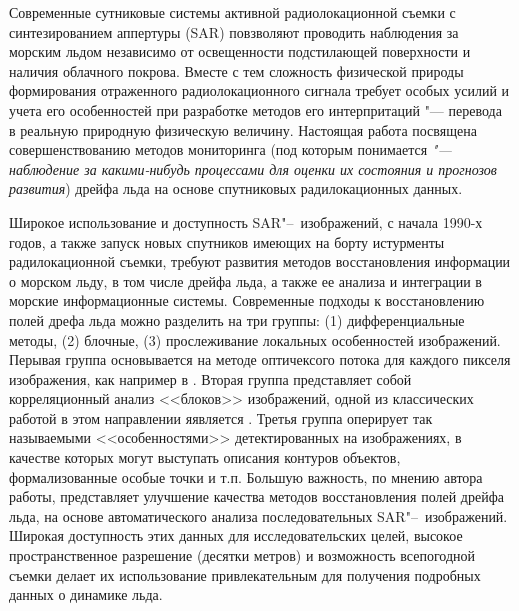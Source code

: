Современные сутниковые системы активной радиолокационной съемки с синтезированием аппертуры (SAR)  \cite{sar} повзволяют проводить наблюдения за морским льдом независимо от освещенности подстилающей поверхности и наличия облачного покрова. Вместе с тем сложность физической природы формирования отраженного радиолокационного сигнала требует особых усилий и учета его особенностей при разработке методов его интерпритаций "--- перевода в реальную природную физическую величину. Настоящая работа посвящена совершенствованию методов мониторинга (под которым понимается \textit{"--- наблюдение за какими-нибудь процессами для оценки их состояния и прогнозов развития}) дрейфа льда на основе спутниковых радилокационных данных.

Широкое использование и доступность SAR"--~изображений, с начала 1990-х годов, а также запуск новых спутников имеющих на борту истурменты радилокационной съемки, требуют развития методов восстановления информации о морском льду, в том числе дрейфа льда, а также ее анализа и интеграции в морские информационные системы. Современные подходы к восстановлению полей дрефа льда можно разделить на три группы: (1) дифференциальные методы, (2) блочные, (3) прослеживание локальных особенностей изображений. Перывая группа основывается на методе оптичексого потока для каждого пикселя изображения, как например в \cite{sun1996automatic}. Вторая группа представляет собой корреляционный анализ <<блоков>> изображений, одной из классических работой в этом направлении яявляется \cite{fily1986extracting}. Третья группа оперирует так называемыми <<особенностями>> детектированных на изображениях, в качестве которых могут выступать описания контуров объектов, формализованные особые точки и т.п. \cite{daida1990object,mcconnell1991psi} 
Большую важность, по мнению автора работы, представляет улучшение качества методов восстановления полей дрейфа льда, на основе автоматического анализа последовательных SAR"--~изображений. Широкая доступность этих данных для исследовательских целей, высокое пространственное разрешение (десятки метров) и возможность всепогодной съемки делает их использование привлекательным для получения подробных данных о динамике льда.




